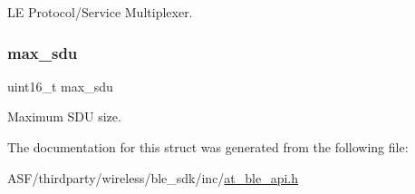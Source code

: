 LE Protocol/\+Service Multiplexer. 

\mbox{\label{structat__ble__lecb__conn__req__t_a4b5effde26a738c2ddaad78c595bf745}} 
\subsubsection{\texorpdfstring{max\_sdu}{max\_sdu}}
{\footnotesize\ttfamily uint16\+\_\+t max\+\_\+sdu}



Maximum S\+DU size. 



The documentation for this struct was generated from the following file\+:\begin{DoxyCompactItemize}
\item 
A\+S\+F/thirdparty/wireless/ble\+\_\+sdk/inc/\mbox{\hyperlink{at__ble__api_8h}{at\+\_\+ble\+\_\+api.\+h}}\end{DoxyCompactItemize}

